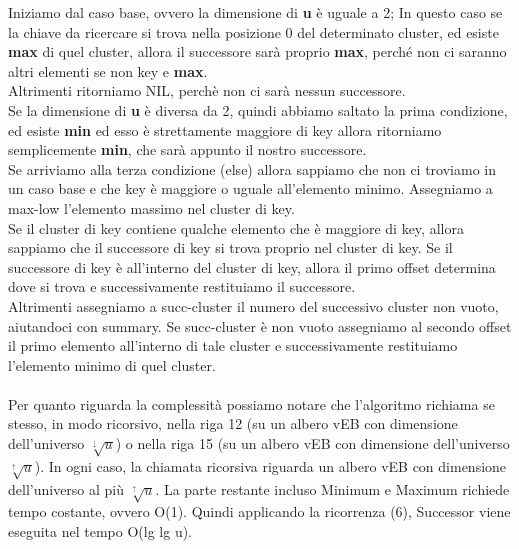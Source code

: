 \documentclass{article}
\begin{document}
            Iniziamo dal caso base, ovvero la dimensione di \textbf{u} è uguale a 2;
            In questo caso se la chiave da ricercare si trova nella posizione 0 del determinato cluster, ed esiste \textbf{max} di quel cluster, allora il successore sarà proprio \textbf{max}, perché non ci saranno altri elementi se non key e \textbf{max}. \\
            Altrimenti ritorniamo NIL, perchè non ci sarà nessun successore.\\
            Se la dimensione di \textbf{u} è diversa da 2, quindi abbiamo saltato la prima condizione, ed esiste \textbf{min} ed esso è strettamente maggiore di key allora ritorniamo semplicemente \textbf{min}, che sarà appunto il nostro successore.\\
            Se arriviamo alla terza condizione (else) allora sappiamo che non ci troviamo in un caso base e che key è maggiore o uguale all'elemento minimo. Assegniamo a max-low l'elemento massimo nel cluster di key.\\
            Se il cluster di key contiene qualche elemento che è maggiore di key, allora sappiamo che il successore di key si trova proprio nel cluster di key. Se il successore di key è all'interno del cluster di key, allora il primo offset determina dove si trova e successivamente restituiamo il successore.\\
            Altrimenti assegniamo a succ-cluster il numero del successivo cluster non vuoto, aiutandoci con summary. Se succ-cluster è non vuoto assegniamo al secondo offset il primo elemento all'interno di tale cluster e successivamente restituiamo l'elemento minimo di quel cluster.\\
            \\
            Per quanto riguarda la complessità possiamo notare che l'algoritmo richiama se stesso, in modo ricorsivo, nella riga 12 (su un albero vEB con dimensione dell'universo $\sqrt[\downarrow]{u}$) o nella riga 15 (su un albero vEB con dimensione dell'universo $\sqrt[\uparrow]{u}$). In ogni caso, la chiamata ricorsiva riguarda un albero vEB con dimensione dell'universo al più $\sqrt[\uparrow]{u}$. La parte restante incluso Minimum e Maximum richiede tempo costante, ovvero O(1).
            Quindi applicando la ricorrenza (6), Successor viene eseguita nel tempo O(lg lg u).\\\\
                
\end{document}
